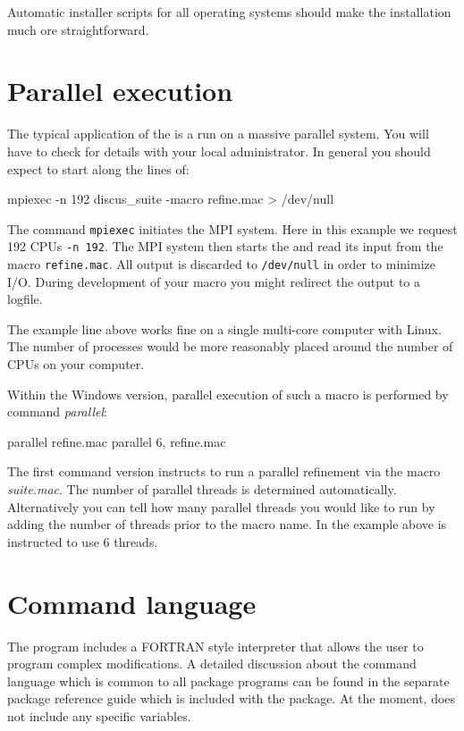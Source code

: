 Automatic installer scripts for all operating systems should make
the installation much ore straightforward.

\section{Parallel execution \label{intro-par}}

The typical application of the \Suite is a run on a massive parallel 
system. You will have to check for details with your local administrator.
In general you should expect to start \Suite along the lines of:

\begin{MacVerbatim}
mpiexec -n 192 discus_suite -macro refine.mac > /dev/null
\end{MacVerbatim}

The command {\tt mpiexec} initiates the MPI system. Here in this example
we request 192 CPUs {\tt -n 192}. The MPI system then starts the \Suite
and read its input from the macro {\tt refine.mac}. All output is discarded
 to {\tt /dev/null} in order to minimize I/O. During development of your 
macro you might redirect the output to a logfile.

The example line above works fine on a single multi-core computer with 
Linux. The number of processes would be more reasonably placed around 
the number of CPUs on your computer.

Within the Windows version, parallel execution of such a macro is 
performed by \Suite command {\it parallel}:

\begin{MacVerbatim}
parallel refine.mac 
parallel 6, refine.mac 
\end{MacVerbatim}

The first command version instructs \Suite to run a parallel 
refinement via the macro {\it suite.mac}. The number of parallel 
threads is determined automatically. Alternatively you can tell 
\Suite how many parallel threads you would like to run by adding the
number of threads prior to the macro name. In the example above 
\Suite is instructed to use 6 threads.



\section{Command language}

The program includes a FORTRAN style interpreter that allows the
user to program complex modifications. A detailed discussion about the 
command language which is common to all \Discus package programs can be 
found in the separate \Discus package reference guide which is included with 
the package. At the moment, \Suite does not include any specific
variables.


